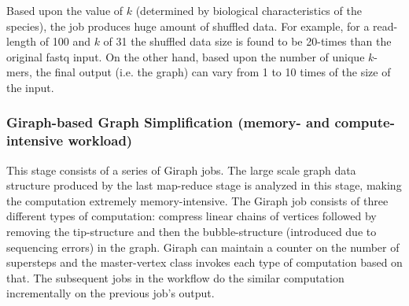 \documentclass[conference]{IEEEtran}
\begin{document}
Based upon the value of $k$ (determined by biological characteristics of the species), the job produces huge amount of shuffled data. 
For example, for a read-length of 100 and $k$ of 31 the shuffled data size is found to be 20-times than the original fastq input.
On the other hand, based upon the number of unique $k$-mers, the final output (i.e. the graph) can vary from 1 to 10 times of the size of the input. 

\subsubsection {Giraph-based Graph Simplification (memory- and compute-intensive workload)}
This stage consists of a series of Giraph jobs.
The large scale graph data structure produced by the last map-reduce stage is analyzed in this stage, making the computation extremely memory-intensive.
The Giraph job consists of three different types of computation: compress linear chains of vertices followed by removing the tip-structure and then the bubble-structure (introduced due to sequencing errors) in the graph.
Giraph can maintain a counter on the number of supersteps and the master-vertex class invokes each type of computation based on that.
The subsequent jobs in the workflow do the similar computation incrementally on the previous job's output.
\end{document}
